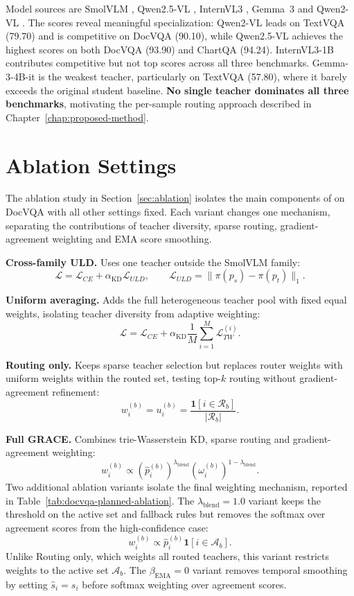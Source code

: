 Model sources are SmolVLM \cite{marafioti2025smolvlm}, Qwen2.5-VL
\cite{qwen25vl3b_modelcard,bai2025qwen25vl}, InternVL3
\cite{internvl3_blog}, Gemma~3 \cite{gemma3_technical_report} and Qwen2-VL
\cite{qwen2vl2b_modelcard,wang2024qwen2vl}. The scores reveal meaningful
specialization: Qwen2-VL leads on TextVQA (79.70) and is competitive on
DocVQA (90.10), while Qwen2.5-VL achieves the highest scores on both DocVQA
(93.90) and ChartQA (94.24). InternVL3-1B contributes competitive but not
top scores across all three benchmarks. Gemma-3-4B-it is the weakest
teacher, particularly on TextVQA (57.80), where it barely exceeds the
original student baseline. \textbf{No single teacher dominates all three
benchmarks}, motivating the per-sample routing approach described in
Chapter~\ref{chap:proposed-method}.


\section{Ablation Settings}
\label{sec:ablation-settings}

The ablation study in Section~\ref{sec:ablation} isolates the main components
of \methodname{} on DocVQA with all other settings fixed. Each variant changes
one mechanism, separating the contributions of teacher diversity, sparse
routing, gradient-agreement weighting and EMA score smoothing.

\textbf{Cross-family ULD.} Uses one teacher outside the SmolVLM family:
\[
\mathcal{L}
=
\mathcal{L}_{CE}
+
\alpha_{\mathrm{KD}}\mathcal{L}_{ULD},
\qquad
\mathcal{L}_{ULD}
=
\|\pi(p_s)-\pi(p_t)\|_1 .
\]

\textbf{Uniform averaging.} Adds the full heterogeneous teacher pool with fixed
equal weights, isolating teacher diversity from adaptive weighting:
\[
\mathcal{L}
=
\mathcal{L}_{CE}
+
\alpha_{\mathrm{KD}}\frac{1}{M}\sum_{i=1}^{M}\mathcal{L}_{TW}^{(i)}.
\]

\textbf{Routing only.} Keeps sparse teacher selection but replaces router
weights with uniform weights within the routed set, testing top-\(k\) routing
without gradient-agreement refinement:
\[
w_i^{(b)}
=
u_i^{(b)}
=
\frac{\mathbf{1}[i\in\mathcal{R}_b]}{|\mathcal{R}_b|}.
\]

\textbf{Full GRACE.} Combines trie-Wasserstein KD, sparse routing and
gradient-agreement weighting:
\[
w_i^{(b)}
\propto
(\hat p_i^{(b)})^{\lambda_{\mathrm{blend}}}
(\omega_i^{(b)})^{1-\lambda_{\mathrm{blend}}}.
\]
Two additional ablation variants isolate the final weighting mechanism,
reported in Table~\ref{tab:docvqa-planned-ablation}. The
\(\lambda_{\mathrm{blend}}=1.0\) variant keeps the threshold on the active set and
fallback rules but removes the softmax over agreement scores from the
high-confidence case:
\[
w_i^{(b)}
\propto
\hat{p}_i^{(b)}\mathbf{1}[i\in\mathcal{A}_b].
\]
Unlike Routing only, which weights all routed teachers, this variant restricts
weights to the active set \(\mathcal{A}_b\). The
\(\beta_{\mathrm{EMA}}=0\)
variant removes temporal smoothing by setting \(\hat{s}_i=s_i\) before
softmax weighting over agreement scores.
